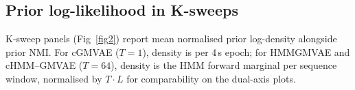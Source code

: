 \subsection{Prior log-likelihood in K-sweeps}
K-sweep panels (Fig~\ref{fig2}) report mean normalised prior log-density alongside prior NMI.
For cGMVAE ($T{=}1$), density is per 4\,s epoch; for HMMGMVAE and cHMM--GMVAE ($T{=}64$), density is the HMM forward marginal per sequence window, normalised by $T \cdot L$ for comparability on the dual-axis plots.
